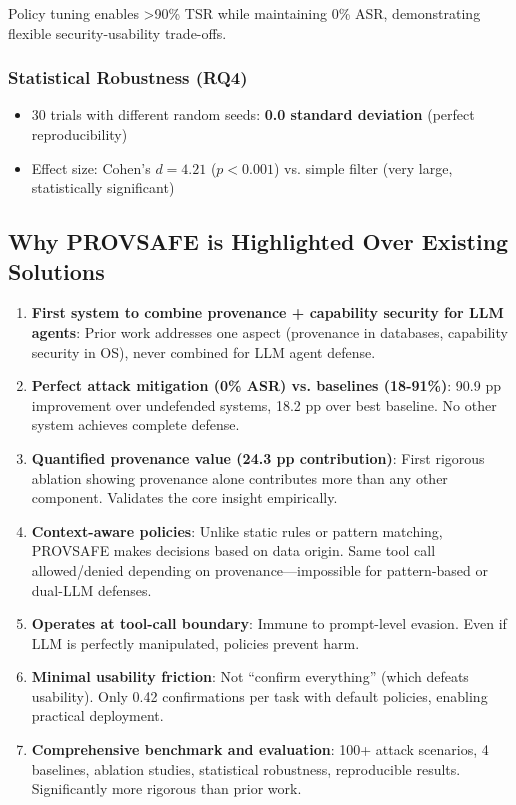 Policy tuning enables >90\% TSR while maintaining 0\% ASR, demonstrating flexible security-usability trade-offs.

\subsubsection{Statistical Robustness (RQ4)}

\begin{itemize}[leftmargin=1.2em]
  \item 30 trials with different random seeds: \textbf{0.0 standard deviation} (perfect reproducibility)
  \item Effect size: Cohen's \textbf{$d = 4.21$} ($p < 0.001$) vs. simple filter (very large, statistically significant)
\end{itemize}

\subsection{Why PROVSAFE is Highlighted Over Existing Solutions}

\begin{enumerate}[leftmargin=1.2em]
  \item \textbf{First system to combine provenance + capability security for LLM agents}: Prior work addresses one aspect (provenance in databases, capability security in OS), never combined for LLM agent defense.
  
  \item \textbf{Perfect attack mitigation (0\% ASR) vs. baselines (18-91\%)}: 90.9 pp improvement over undefended systems, 18.2 pp over best baseline. No other system achieves complete defense.
  
  \item \textbf{Quantified provenance value (24.3 pp contribution)}: First rigorous ablation showing provenance alone contributes more than any other component. Validates the core insight empirically.
  
  \item \textbf{Context-aware policies}: Unlike static rules or pattern matching, PROVSAFE makes decisions based on data origin. Same tool call allowed/denied depending on provenance---impossible for pattern-based or dual-LLM defenses.
  
  \item \textbf{Operates at tool-call boundary}: Immune to prompt-level evasion. Even if LLM is perfectly manipulated, policies prevent harm.
  
  \item \textbf{Minimal usability friction}: Not ``confirm everything'' (which defeats usability). Only 0.42 confirmations per task with default policies, enabling practical deployment.
  
  \item \textbf{Comprehensive benchmark and evaluation}: 100+ attack scenarios, 4 baselines, ablation studies, statistical robustness, reproducible results. Significantly more rigorous than prior work.
\end{enumerate}

